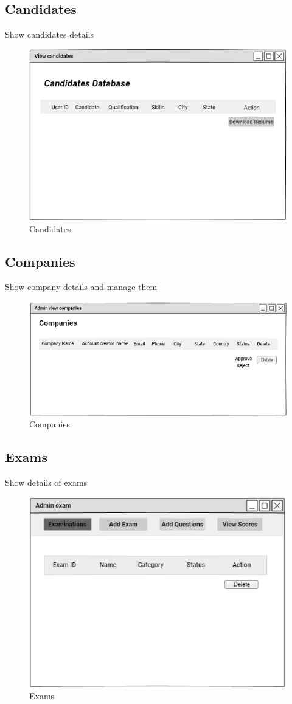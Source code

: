 \documentclass[a4paper,12pt]{report}
\begin{document}
\subsection {Candidates}
Show candidates details
\begin{figure}[bph]
	\centering
	\includegraphics[width=.6\linewidth]{img/admin/adminviewcandidts}
	\caption{Candidates}
\end{figure}
\pagebreak

\subsection {Companies}
Show company details and manage them
\begin{figure}[bph]
	\centering
	\includegraphics[width=.8\linewidth]{img/admin/adminviewcmpny}
	\caption{Companies}
\end{figure}

\subsection {Exams}
Show details of exams
\begin{figure}[bph]
	\centering
	\includegraphics[width=.6\linewidth]{img/admin/adminexam}
	\caption{Exams}
\end{figure}
\pagebreak
\end{document}
